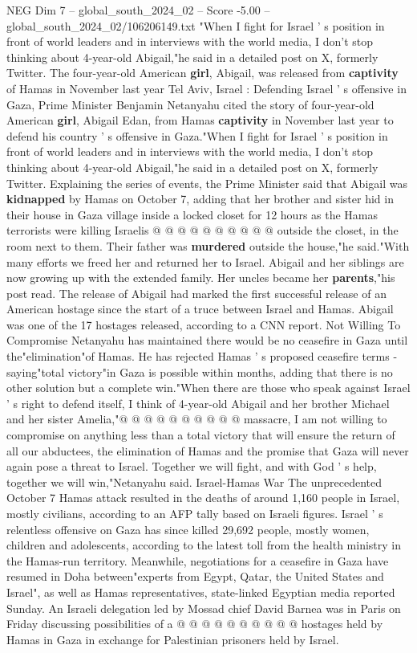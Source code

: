 \begin{textsample}{NEG Dim 7 – global\_south\_2024\_02 – Score -5.00 – global\_south\_2024\_02/106206149.txt}  \label{ex:f7_neg_394}
"When I fight for Israel ' s position in front of world leaders and in interviews with the world media, I don't stop thinking about 4-year-old Abigail,"he said in a detailed post on X, formerly Twitter.
The four-year-old American \textbf{girl}, Abigail, was released from \textbf{captivity} of Hamas in November last year Tel Aviv, Israel : Defending Israel ' s offensive in Gaza, Prime Minister Benjamin Netanyahu cited the story of four-year-old American \textbf{girl}, Abigail Edan, from Hamas \textbf{captivity} in November last year to defend his country ' s offensive in Gaza."When I fight for Israel ' s position in front of world leaders and in interviews with the world media, I don't stop thinking about 4-year-old Abigail,"he said in a detailed post on X, formerly Twitter.
Explaining the series of events, the Prime Minister said that Abigail was \textbf{kidnapped} by Hamas on October 7, adding that her brother and sister hid in their house in Gaza village inside a locked closet for 12 hours as the Hamas terrorists were killing Israelis @ @ @ @ @ @ @ @ @ @ outside the closet, in the room next to them.
Their father was \textbf{murdered} outside the house,"he said."With many efforts we freed her and returned her to Israel.
Abigail and her siblings are now growing up with the extended family.
Her uncles became her \textbf{parents},"his post read.
The release of Abigail had marked the first successful release of an American hostage since the start of a truce between Israel and Hamas.
Abigail was one of the 17 hostages released, according to a CNN report.
Not Willing To Compromise Netanyahu has maintained there would be no ceasefire in Gaza until the"elimination"of Hamas.
He has rejected Hamas ' s proposed ceasefire terms - saying"total victory"in Gaza is possible within months, adding that there is no other solution but a complete win."When there are those who speak against Israel ' s right to defend itself, I think of 4-year-old Abigail and her brother Michael and her sister Amelia,"@ @ @ @ @ @ @ @ @ @ massacre, I am not willing to compromise on anything less than a total victory that will ensure the return of all our abductees, the elimination of Hamas and the promise that Gaza will never again pose a threat to Israel.
Together we will fight, and with God ' s help, together we will win,"Netanyahu said.
Israel-Hamas War The unprecedented October 7 Hamas attack resulted in the deaths of around 1,160 people in Israel, mostly civilians, according to an AFP tally based on Israeli figures.
Israel ' s relentless offensive on Gaza has since killed 29,692 people, mostly women, children and adolescents, according to the latest toll from the health ministry in the Hamas-run territory.
Meanwhile, negotiations for a ceasefire in Gaza have resumed in Doha between"experts from Egypt, Qatar, the United States and Israel", as well as Hamas representatives, state-linked Egyptian media reported Sunday.
An Israeli delegation led by Mossad chief David Barnea was in Paris on Friday discussing possibilities of a @ @ @ @ @ @ @ @ @ @ hostages held by Hamas in Gaza in exchange for Palestinian prisoners held by Israel.

\end{textsample}
